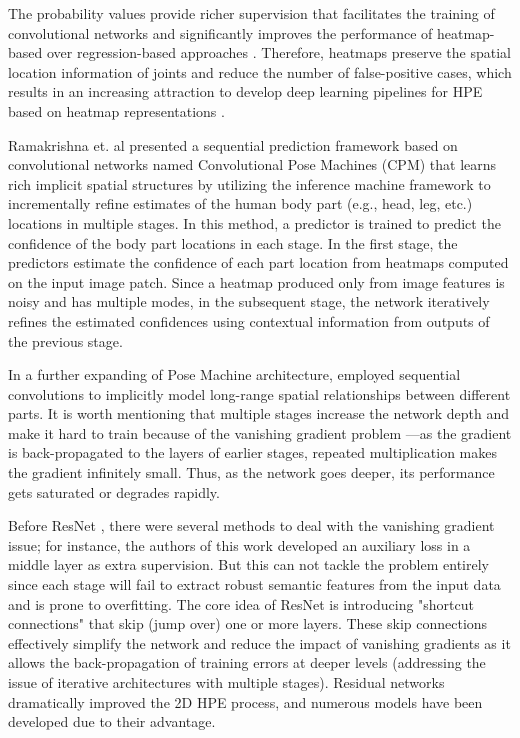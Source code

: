 The probability values provide richer supervision that facilitates the training of convolutional networks and significantly improves the performance of heatmap-based over regression-based approaches \cite{artacho_unipose_2020, bulat_human_2016,gkioxari_chained_2016, lifshitz_human_2016,newell_stacked_2016,tompson_efficient_2015}. Therefore, heatmaps preserve the spatial location information of joints and reduce the number of false-positive cases, which results in an increasing attraction to develop deep learning pipelines for HPE based on heatmap representations \cite{carreira_human_2016,luo_lstm_2018,toshev_deeppose_2014,wei_convolutional_2016}.

Ramakrishna et. al \cite{ramakrishna_pose_2014} presented a sequential prediction framework based on convolutional networks named Convolutional Pose Machines (CPM) that learns rich implicit spatial structures by utilizing the inference machine framework to incrementally refine estimates of the human body part (e.g., head, leg, etc.) locations in multiple stages. In this method, a predictor is trained to predict the confidence of the body part locations in each stage. In the first stage, the predictors estimate the confidence of each part location from heatmaps computed on the input image patch. Since a heatmap produced only from image features is noisy and has multiple modes, in the subsequent stage, the network iteratively refines the estimated confidences using contextual information from outputs of the previous stage. 

In a further expanding of Pose Machine architecture, \cite{wei_convolutional_2016} employed sequential convolutions to implicitly model long-range spatial relationships between different parts. It is worth mentioning that multiple stages increase the network depth and make it hard to train because of the vanishing gradient problem ---as the gradient is back-propagated to the layers of earlier stages, repeated multiplication makes the gradient infinitely small. Thus, as the network goes deeper, its performance gets saturated or degrades rapidly. 

Before ResNet \cite{he_deep_2016}, there were several methods to deal with the vanishing gradient issue; for instance, the authors of this work \cite{wei_convolutional_2016} developed an auxiliary loss in a middle layer as extra supervision. But this can not tackle the problem entirely since each stage will fail to extract robust semantic features from the input data and is prone to overfitting. The core idea of ResNet is introducing "shortcut connections" that skip (jump over) one or more layers. These skip connections effectively simplify the network and reduce the impact of vanishing gradients as it allows the back-propagation of training errors at deeper levels (addressing the issue of iterative architectures with multiple stages). Residual networks dramatically improved the 2D HPE process, and numerous models
\cite{cai_learning_2020, chen_cascaded_2018, chu_multi-context_2017, ke_multi-scale_2018, liu_cascaded_2018, newell_stacked_2016, su_multi-person_2019, sun_deep_2019, xiao_simple_2018-1, yang_learning_2017} have been developed due to their advantage. 

